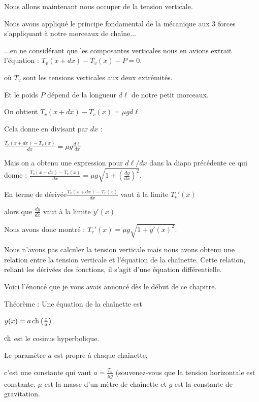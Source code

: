 Nous allons maintenant nous occuper de la tension verticale.

\change
Nous avons appliqué le principe fondamental de la mécanique
aux $3$ forces s'appliquant à notre morceaux de chaîne...

\change
...en ne considérant que les composantes verticales 
nous en avions extrait l'équation :
$T_v(x+dx)-T_v(x) -P = 0.$

où $T_v$ sont les tensions verticales aux deux extrémités.

\change
Et le poids $P$ dépend de la longueur $d\ell$ de notre petit morceaux.

\change
On obtient $T_v(x+dx)-T_v(x)= \mu g d\ell$

\change
Cela donne en divisant par $dx$ :

$\frac{T_v(x+dx)-T_v(x)}{dx} = \mu g \frac {d\ell}{dx}$

\change
Mais on a obtenu une expression pour $d\ell/dx$ dans la diapo précédente
ce qui donne : 
$\frac{T_v(x+dx)-T_v(x)}{dx} =\mu g \sqrt{1+ \left(\frac{dy}{dx}\right)^2} .$

\change
En terme de dérivée$\frac{T_v(x+dx)-T_v(x)}{dx}$ vaut à la limite $T_v'(x)$

\change
alors que $\frac{dy}{dx}$ vaut à la limite $y'(x)$

\change
Nous avons donc montré :
$T_v'(x) = \mu g \sqrt{1+ y'(x)^2}.$

Nous n'avons pas calculer la tension verticale mais nous avons obtenu une relation
entre la tension verticale et l'équation de la chaînette.
Cette relation, reliant les dérivées des fonctions, il s'agit d'une équation différentielle.



\diapo

Voici l'énoncé que je vous avais annoncé dès le début de ce chapitre.

Théorème : 
Une équation de la chaînette est 

$y(x) = a \mathop{\mathrm{ch}}\nolimits \left( \frac x a\right)$.

$\mathop{\mathrm{ch}}\nolimits$ est le cosinus hyperbolique.

\change
Le paramètre $a$ est  propre à chaque chaînette,

c'est une constante qui vaut $a = \frac {T_h}{\mu g}$
(souvenez-vous que la tension horizontale est constante,
$\mu$ est la masse d'un mètre de chaînette et $g$ est la constante de gravitation.



